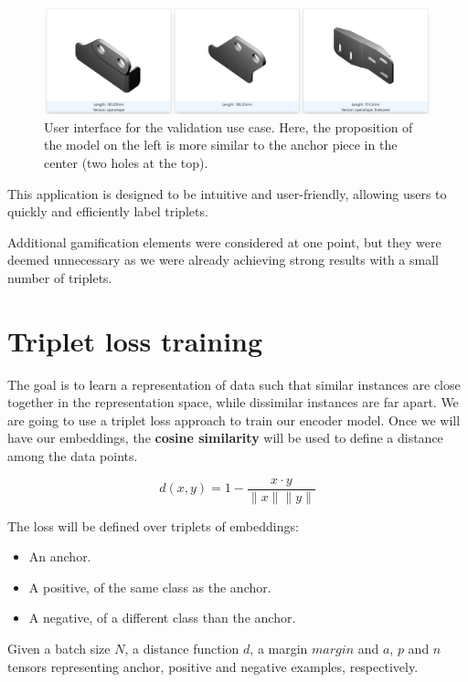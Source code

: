 \begin{figure}[]
  \centering
  \includegraphics[width=0.8\columnwidth]{images/tinder3d_validation.png}
  \caption{User interface for the validation use case. Here, the proposition of the model on the left is more similar to the anchor piece in the center (two holes at the top).}
  \label{fig:validation_use_case}
\end{figure}

This application is designed to be intuitive and user-friendly, allowing users to quickly and efficiently label triplets.

Additional gamification elements were considered at one point, but they were deemed unnecessary as we were already achieving strong results with a small number of triplets.

\section{Triplet loss training}
\label{sec:triplet-loss-training}

The goal is to learn a representation of data such that similar instances are close together in the representation space, while dissimilar instances are far apart. We are going to use a triplet loss approach to train our encoder model. Once we will have our embeddings, the \textbf{cosine similarity} will be used to define a distance among the data points.

$$d(x, y) = 1 - \frac{x \cdot y}{\|x\| \|y\|}$$

The loss will be defined over triplets of embeddings:
\begin{itemize}
  \item An anchor.
  \item A positive, of the same class as the anchor.
  \item A negative, of a different class than the anchor.
\end{itemize}

\vspace{0.2cm}

Given a batch size $N$, a distance function $d$, a margin $margin$ and $a$, $p$ and $n$ tensors representing anchor, positive and negative examples, respectively.

